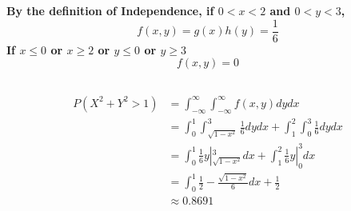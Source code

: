 \documentclass{article}
\begin{document}
    \section{}
        \subsection{}
            \paragraph{
                By the definition of Independence, if $0<x<2$ and $0<y<3$,
                $$f(x,y)=g(x)h(y)=\frac{1}{6}$$
                If $x\leq 0$ or $x\geq 2$ or $y\leq 0$ or $y\geq 3$
                $$f(x,y)=0$$
            }
        \subsection{}
            \paragraph{
                \begin{equation}
                    \begin{split}
                        P(X^2+Y^2>1)&=\int _{-\infty} ^\infty \int _{-\infty} ^\infty f(x,y)dy dx\\
                        &=\int _0 ^1 \int _{\sqrt{1-x^2}} ^3 \frac{1}{6} dy dx+\int _1 ^2 \int _0 ^3 \frac{1}{6} dy dx\\
                        &=\int _0 ^1 \frac{1}{6}y| _{\sqrt{1-x^2}} ^3 dx+\int _1 ^2 \frac{1}{6}y| _{0} ^3 dx\\
                        &=\int _0 ^1 \frac{1}{2}-\frac{\sqrt{1-x^2}}{6} dx +\frac{1}{2}\\
                        &\approx 0.8691
                    \end{split}
                \end{equation}
            }
\end{document}
